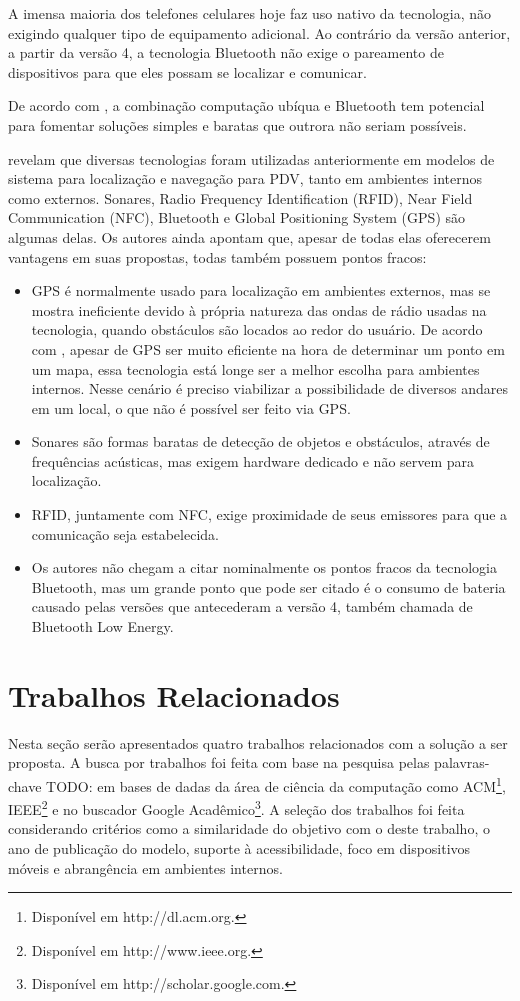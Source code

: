 \documentclass[twoside,english,brazilian]{UNISINOSartigo}
\begin{document}
A imensa maioria dos telefones celulares hoje faz uso nativo da tecnologia, não exigindo qualquer tipo de equipamento adicional. Ao contrário da versão anterior, a partir da versão 4, a tecnologia Bluetooth não exige o pareamento de dispositivos para que eles possam se localizar e comunicar.

De acordo com , a combinação computação ubíqua e Bluetooth tem potencial para fomentar soluções simples e baratas que outrora não seriam possíveis.

 revelam que diversas tecnologias foram utilizadas anteriormente em modelos de sistema para localização e navegação para PDV, tanto em ambientes internos como externos. Sonares, Radio Frequency Identification (RFID), Near Field Communication (NFC), Bluetooth e Global Positioning System (GPS) são algumas delas. Os autores ainda apontam que, apesar de todas elas oferecerem vantagens em suas propostas, todas também possuem pontos fracos:

\begin{itemize}
  \item GPS é normalmente usado para localização em ambientes externos, mas se mostra ineficiente devido à própria natureza das ondas de rádio usadas na tecnologia, quando obstáculos são locados ao redor do usuário. De acordo com , apesar de GPS ser muito eficiente na hora de determinar um ponto em um mapa, essa tecnologia está longe ser a melhor escolha para ambientes internos. Nesse cenário é preciso viabilizar a possibilidade de diversos andares em um local, o que não é possível ser feito via GPS.
  \item Sonares são formas baratas de detecção de objetos e obstáculos, através de frequências acústicas, mas exigem hardware dedicado e não servem para localização.
  \item RFID, juntamente com NFC, exige proximidade de seus emissores para que a comunicação seja estabelecida.
  \item Os autores não chegam a citar nominalmente os pontos fracos da tecnologia Bluetooth, mas um grande ponto que pode ser citado é o consumo de bateria causado pelas versões que antecederam a versão 4, também chamada de Bluetooth Low Energy.
\end{itemize}

\section{Trabalhos Relacionados}
Nesta seção serão apresentados quatro trabalhos relacionados com a solução a ser proposta. A busca por trabalhos foi feita com base na pesquisa pelas palavras-chave TODO: em bases de dadas da área de ciência da computação como ACM\footnote{Disponível em http://dl.acm.org.}, IEEE\footnote{Disponível em http://www.ieee.org.} e no buscador Google Acadêmico\footnote{Disponível em http://scholar.google.com.}. A seleção dos trabalhos foi feita considerando critérios como a similaridade do objetivo com o deste trabalho, o ano de publicação do modelo, suporte à acessibilidade, foco em dispositivos móveis e abrangência em ambientes internos. 
\end{document}
